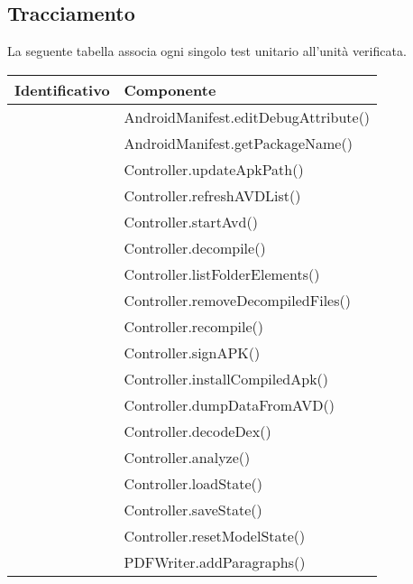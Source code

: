 \subsection{Tracciamento}\label{subsec:tracciamento-unitari}
La seguente tabella associa ogni singolo test unitario all'unità verificata.
\begin{center}
    \begin{longtable}{ |C{3cm} |C{10.5cm}|}
        \hline
        \textbf{Identificativo} &
        \textbf{Componente} \\\hline
         & AndroidManifest.editDebugAttribute()       \\\hline
         & AndroidManifest.getPackageName()           \\\hline
         & Controller.updateApkPath()                 \\\hline
         & Controller.refreshAVDList()                \\\hline
         & Controller.startAvd()                      \\\hline
         & Controller.decompile()                     \\\hline
         & Controller.listFolderElements()            \\\hline
         & Controller.removeDecompiledFiles()         \\\hline
         & Controller.recompile()                     \\\hline
         & Controller.signAPK()                       \\\hline
         & Controller.installCompiledApk()            \\\hline
         & Controller.dumpDataFromAVD()               \\\hline
         & Controller.decodeDex()                     \\\hline
         & Controller.analyze()                       \\\hline
         & Controller.loadState()                     \\\hline
         & Controller.saveState()                     \\\hline
         & Controller.resetModelState()               \\\hline
         & PDFWriter.addParagraphs()                  \\\hline

\end{longtable}
\end{center}
